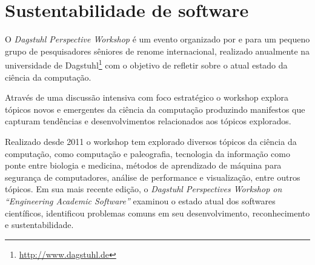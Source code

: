
\section{Sustentabilidade de software} \label{sustentabilidade}


O {\it Dagstuhl Perspective Workshop} é um evento organizado por e para um
pequeno grupo de pesquisadores sêniores de renome internacional, realizado
anualmente na universidade de Dagstuhl\footnote{\url{http://www.dagstuhl.de}}
com o objetivo de refletir sobre o atual estado da ciência da computação.

Através de uma discussão intensiva com foco estratégico o workshop explora
tópicos novos e emergentes da ciência da computação produzindo manifestos que
capturam tendências e desenvolvimentos relacionados aos tópicos explorados.

Realizado desde 2011 o workshop tem explorado diversos tópicos da ciência da
computação, como computação e paleografia, tecnologia da informação como ponte
entre biologia e medicina, métodos de aprendizado de máquina para segurança de
computadores, análise de performance e visualização, entre outros tópicos. Em
sua mais recente edição, o {\it Dagstuhl Perspectives Workshop on ``Engineering
Academic Software''} \cite{allen2017engineering} examinou o estado atual dos
softwares científicos, identificou problemas comuns em seu desenvolvimento,
reconhecimento e sustentabilidade.


